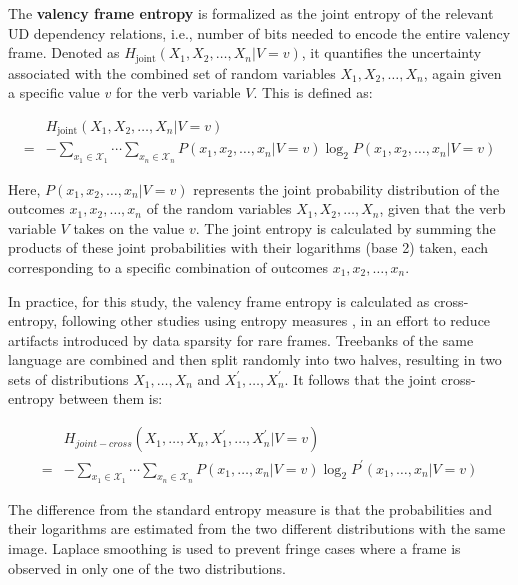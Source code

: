 The \textbf{valency frame entropy} is formalized as the joint entropy of the relevant UD dependency relations, i.e., number of bits needed to encode the entire valency frame. Denoted as $H_{\text{joint}}(X_1, X_2, \ldots, X_n | V = v)$, it quantifies the uncertainty associated with the combined set of random variables $X_1, X_2, \ldots, X_n$, again given a specific value $v$ for the verb variable $V$. This is defined as:

\begin{equation*}
\begin{split}
 & H_{\text{joint}}(X_1, X_2, \ldots, X_n | V=v) \\
=& -\sum\limits_{x_1\in{}\mathcal{X}_1}\cdots\sum\limits_{x_n\in{}\mathcal{X}_n}{P(x_1, x_2, \ldots,x_{n}|V=v)\log_2P(x_1, x_2, \ldots,x_n|V=v)}
\end{split}
\end{equation*}

Here, $P(x_1, x_2, \ldots, x_n | V = v)$ represents the joint probability distribution of the outcomes $x_1, x_2, \ldots, x_n$ of the random variables $X_1, X_2, \ldots, X_n$, given that the verb variable $V$ takes on the value $v$. The joint entropy is calculated by summing the products of these joint probabilities with their logarithms (base 2) taken, each corresponding to a specific combination of outcomes $x_1, x_2, \ldots, x_n$.

In practice, for this study, the valency frame entropy is calculated as cross-entropy, following other studies using entropy measures \citep{hahn2021}, in an effort to reduce artifacts introduced by data sparsity for rare frames. Treebanks of the same language are combined and then split randomly into two halves, resulting in two sets of distributions $X_1,\ldots,X_n$ and $X_1^{\prime},\ldots,X_n^{\prime}$. It follows that the joint cross-entropy between them is:

\begin{equation*}
  \begin{split}
   & H_{joint-cross}(X_{1},\ldots,X_{n},X_{1}^{\prime},\ldots,X_{n}^{\prime}|V=v)\\
  =& -\sum\limits_{x_1\in{}\mathcal{X}_1}\cdots\sum\limits_{x_n\in{}\mathcal{X}_n}{P(x_1,\ldots,x_{n}|V=v)\log_{2}P^{\prime}(x_1,\ldots,x_n|V=v)}
  \end{split}
\end{equation*}
  
The difference from the standard entropy measure is that the probabilities and their logarithms are estimated from the two different distributions with the same image. Laplace smoothing is used to prevent fringe cases where a frame is observed in only one of the two distributions.

